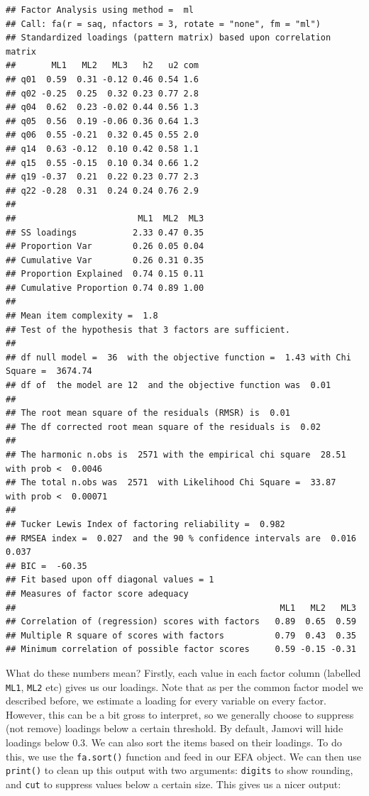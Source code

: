 \documentclass[
]{book}
\begin{document}
\begin{verbatim}
## Factor Analysis using method =  ml
## Call: fa(r = saq, nfactors = 3, rotate = "none", fm = "ml")
## Standardized loadings (pattern matrix) based upon correlation matrix
##       ML1   ML2   ML3   h2   u2 com
## q01  0.59  0.31 -0.12 0.46 0.54 1.6
## q02 -0.25  0.25  0.32 0.23 0.77 2.8
## q04  0.62  0.23 -0.02 0.44 0.56 1.3
## q05  0.56  0.19 -0.06 0.36 0.64 1.3
## q06  0.55 -0.21  0.32 0.45 0.55 2.0
## q14  0.63 -0.12  0.10 0.42 0.58 1.1
## q15  0.55 -0.15  0.10 0.34 0.66 1.2
## q19 -0.37  0.21  0.22 0.23 0.77 2.3
## q22 -0.28  0.31  0.24 0.24 0.76 2.9
## 
##                        ML1  ML2  ML3
## SS loadings           2.33 0.47 0.35
## Proportion Var        0.26 0.05 0.04
## Cumulative Var        0.26 0.31 0.35
## Proportion Explained  0.74 0.15 0.11
## Cumulative Proportion 0.74 0.89 1.00
## 
## Mean item complexity =  1.8
## Test of the hypothesis that 3 factors are sufficient.
## 
## df null model =  36  with the objective function =  1.43 with Chi Square =  3674.74
## df of  the model are 12  and the objective function was  0.01 
## 
## The root mean square of the residuals (RMSR) is  0.01 
## The df corrected root mean square of the residuals is  0.02 
## 
## The harmonic n.obs is  2571 with the empirical chi square  28.51  with prob <  0.0046 
## The total n.obs was  2571  with Likelihood Chi Square =  33.87  with prob <  0.00071 
## 
## Tucker Lewis Index of factoring reliability =  0.982
## RMSEA index =  0.027  and the 90 % confidence intervals are  0.016 0.037
## BIC =  -60.35
## Fit based upon off diagonal values = 1
## Measures of factor score adequacy             
##                                                    ML1   ML2   ML3
## Correlation of (regression) scores with factors   0.89  0.65  0.59
## Multiple R square of scores with factors          0.79  0.43  0.35
## Minimum correlation of possible factor scores     0.59 -0.15 -0.31
\end{verbatim}

What do these numbers mean? Firstly, each value in each factor column (labelled \texttt{ML1}, \texttt{ML2} etc) gives us our loadings. Note that as per the common factor model we described before, we estimate a loading for every variable on every factor. However, this can be a bit gross to interpret, so we generally choose to suppress (not remove) loadings below a certain threshold. By default, Jamovi will hide loadings below 0.3. We can also sort the items based on their loadings. To do this, we use the \texttt{fa.sort()} function and feed in our EFA object. We can then use \texttt{print()} to clean up this output with two arguments: \texttt{digits} to show rounding, and \texttt{cut} to suppress values below a certain size. This gives us a nicer output:
\end{document}
